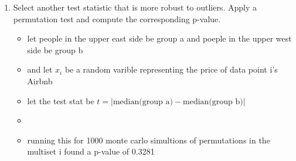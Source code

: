 \documentclass[12pt,twoside]{article}
\begin{document}
\begin{enumerate}
\begin{enumerate}
\item Select another test statistic that is more robust to outliers. Apply a permutation test and compute the corresponding p-value.
\begin{itemize}
  \color{blue}
  \item let people in the upper east side be group a and poeple in the upper west side be group b 
  \item and let $x_i$ be a random varible representing the price of data point i's Airbnb
  \item let the test stat be $t=|\text{median(group a)}-\text{median(group b)}|$
    \item \inputminted[firstline=126, lastline=143, breaklines=True]{python}{hw7.py}
  \item running this for 1000 monte carlo simultions of permutations in the multiset i found a p-value of 0.3281
 
\end{itemize}

\end{enumerate}
\end{enumerate}
\end{document}
